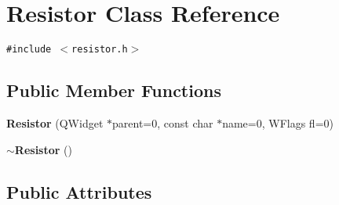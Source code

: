\section{Resistor Class Reference}
\label{classResistor}
{\tt \#include $<$resistor.h$>$}

\subsection*{Public Member Functions}
\begin{CompactItemize}
\item 
{\bf Resistor} (QWidget $\ast$parent=0, const char $\ast$name=0, WFlags fl=0)
\item 
{\bf $\sim$Resistor} ()
\end{CompactItemize}
\subsection*{Public Attributes}
